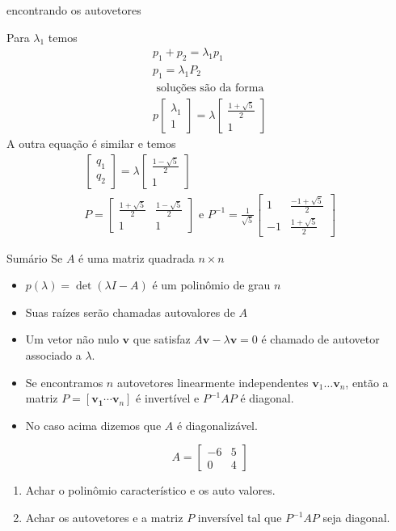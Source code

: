 \documentclass{beamer}
\begin{document}
\begin{frame}{encontrando os autovetores}

  Para $\lambda_1$ temos
  \begin{gather*}
    p_1 + p_2 = \lambda_1 p_1 \\
    p_1 = \lambda_1 P_2 \\
    \text{ soluções são da forma } \\
    p\begin{bmatrix}
      \lambda_1 \\ 1
    \end{bmatrix}=\lambda\begin{bmatrix}
      \frac{1+\sqrt{5}}{2} \\ 1
    \end{bmatrix}
  \end{gather*}
  A outra equação é similar e temos
  \begin{gather}
    \begin{bmatrix}
      q_1 \\ q_2
    \end{bmatrix} = \lambda\begin{bmatrix}
    \frac{1 -\sqrt{5}}{2} \\ 1
    \end{bmatrix} \\ 
    P = \begin{bmatrix}
      \frac{1+\sqrt{5}}{2} & \frac{1-\sqrt{5}}{2}\\ 1 & 1
    \end{bmatrix} \text{ e } P^{-1} =\frac{1}{\sqrt{5}}\begin{bmatrix}
      1 & \frac{-1+\sqrt{5}}{2} \\
      -1 & \frac{1+\sqrt{5}}{2}
    \end{bmatrix} 
  \end{gather}
\end{frame}
\begin{frame}{Sumário}
  Se $A$ é uma matriz quadrada $n \times n$
  \begin{itemize}
    \item $p(\lambda) = \det(\lambda I - A)$ é um polinômio de grau $n$
    \item Suas raízes serão chamadas autovalores de $A$
    \item Um vetor não nulo $\mathbf{v}$ que satisfaz $A\mathbf{v}-\lambda\mathbf{v}=0$ é chamado de autovetor associado a $\lambda$.
    \item Se encontramos $n$ autovetores linearmente independentes $\mathbf{v}_1\dots \mathbf{v}_n$, então a matriz $P=[\mathbf{v_1}\cdots\mathbf{v}_n]$ é invertível e $P^{-1}AP$ é diagonal.
    \item No caso acima dizemos que $A$ é diagonalizável.
  \end{itemize}
  
\end{frame}
\begin{frame}
  $$A = \begin{bmatrix}
    -6 & 5 \\ 0 & 4
  \end{bmatrix}$$
  \begin{enumerate}
    \item Achar o polinômio característico e os auto valores.
    \item Achar os autovetores e a matriz $P$ inversível tal que $P^{-1}AP$ seja diagonal.
  \end{enumerate}
\end{frame}
\end{document}

